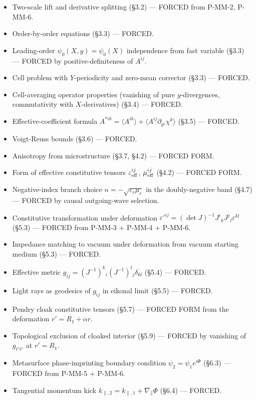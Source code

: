 \documentclass[11pt,a4paper]{article}
\begin{document}
\begin{itemize}[noitemsep]
\item Two-scale lift and derivative splitting (\S3.2) --- FORCED from P-MM-2, P-MM-6.
\item Order-by-order equations (\S3.3) --- FORCED.
\item Leading-order $\psi_0(X, y) = \psi_0(X)$ independence from fast variable (\S3.3) --- FORCED by positive-definiteness of $A^{ij}$.
\item Cell problem with $Y$-periodicity and zero-mean corrector (\S3.3) --- FORCED.
\item Cell-averaging operator properties (vanishing of pure $y$-divergences, commutativity with $X$-derivatives) (\S3.4) --- FORCED.
\item Effective-coefficient formula $A^{*ik} = \langle A^{ik}\rangle + \langle A^{ij}\partial_{y^j}\chi^k\rangle$ (\S3.5) --- FORCED.
\item Voigt-Reuss bounds (\S3.6) --- FORCED.
\item Anisotropy from microstructure (\S3.7, \S4.2) --- FORCED FORM.
\item Form of effective constitutive tensors $\varepsilon_{\rm eff}^{ij}$, $\mu_{\rm eff}^{ij}$ (\S4.2) --- FORCED FORM.
\item Negative-index branch choice $n = -\sqrt{\varepsilon_r\mu_r}$ in the doubly-negative band (\S4.7) --- FORCED by causal outgoing-wave selection.
\item Constitutive transformation under deformation $\varepsilon'^{ij} = (\det J)^{-1} J^i{}_k J^j{}_l \varepsilon^{kl}$ (\S5.3) --- FORCED from P-MM-3 + P-MM-4 + P-MM-6.
\item Impedance matching to vacuum under deformation from vacuum starting medium (\S5.3) --- FORCED.
\item Effective metric $g_{ij} = (J^{-1})^k{}_i (J^{-1})^l{}_j \delta_{kl}$ (\S5.4) --- FORCED.
\item Light rays as geodesics of $g_{ij}$ in eikonal limit (\S5.5) --- FORCED.
\item Pendry cloak constitutive tensors (\S5.7) --- FORCED FORM from the deformation $r' = R_1 + \alpha r$.
\item Topological exclusion of cloaked interior (\S5.9) --- FORCED by vanishing of $g_{\hat r'\hat r'}$ at $r' = R_1$.
\item Metasurface phase-imprinting boundary condition $\psi_2 = \psi_1 e^{i\Phi}$ (\S6.3) --- FORCED from P-MM-5 + P-MM-6.
\item Tangential momentum kick $k_{\parallel,2} = k_{\parallel,1} + \nabla_\parallel\Phi$ (\S6.4) --- FORCED.

\end{itemize}
\end{document}
